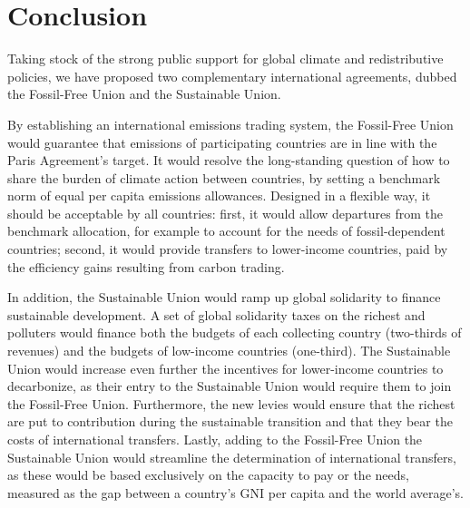 \documentclass[12pt,english]{article}
\begin{document}


\clearpage

\section*{Conclusion}

Taking stock of the strong public support for global climate and redistributive policies,\cite{fabre_majority_2025} we have proposed two complementary international agreements, dubbed the Fossil-Free Union and the Sustainable Union. 

By establishing an international emissions trading system, the Fossil-Free Union would guarantee that emissions of participating countries are in line with the Paris Agreement's target. It would resolve the long-standing question of how to share the burden of climate action between countries, by setting a benchmark norm of equal per capita emissions allowances. Designed in a flexible way, it should be acceptable by all countries: first, it would allow departures from the benchmark allocation, for example to account for the needs of fossil-dependent countries; second, it would provide transfers to lower-income countries, paid by the efficiency gains resulting from carbon trading.

In addition, the Sustainable Union would ramp up global solidarity to finance sustainable development. A set of global solidarity taxes on the richest and polluters would finance both the budgets of each collecting country (two-thirds of revenues) and the budgets of low-income countries (one-third). %
The Sustainable Union would increase even further the incentives for lower-income countries to decarbonize, as their entry to the Sustainable Union would require them to join the Fossil-Free Union. Furthermore, the new levies would ensure that the richest are put to contribution during the sustainable transition and that they bear the costs of international transfers. Lastly, adding to the Fossil-Free Union the Sustainable Union would streamline the determination of international transfers, as these would be based exclusively on the capacity to pay or the needs, measured as the gap between a country's GNI per capita and the world average's.
\end{document}
